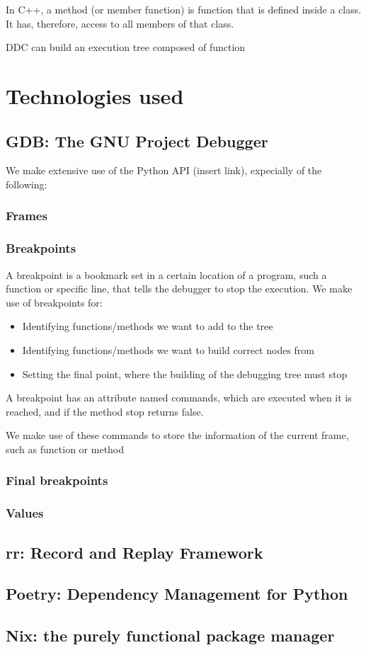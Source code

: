 In C++, a method (or member function) is function that is defined inside a class. It has, therefore, access to all members of that class.

DDC can build an execution tree composed of function
\section{Technologies used}
\subsection{GDB: The GNU Project Debugger}
We make extensive use of the Python API (insert link), expecially of the following:
\subsubsection{Frames}
\subsubsection{Breakpoints}
A breakpoint is a bookmark set in a certain location of a program, such a function or specific line, that tells the debugger to stop the execution.
We make use of breakpoints for:
\begin{itemize}
    \item Identifying functions/methods we want to add to the tree
    \item Identifying functions/methods we want to build correct nodes from
    \item Setting the final point, where the building of the debugging tree must stop
\end{itemize}
A breakpoint has an attribute named commands, which are executed when it is reached, and if the method stop returns false.

We make use of these commands to store the information of the current frame, such as function or method
\subsubsection{Final breakpoints}
\subsubsection{Values}
\subsection{rr: Record and Replay Framework}
\subsection{Poetry: Dependency Management for Python}
\subsection{Nix: the purely functional package manager}
